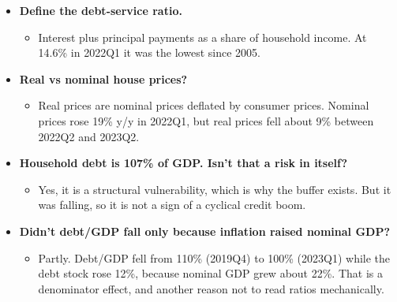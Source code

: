 \documentclass[10pt]{article}
\begin{document}
\begin{tcolorbox}[sbox,width=0.495\linewidth,height=14.6cm,nobeforeafter,box align=top,fit basedim=11pt,colframe=nlred!70,colbacktitle=nlred!8,coltitle=nlred,title=LIKELY CHALLENGES · definitions and logic]
\begin{itemize}
\item[\textcolor{navy}{\textbf{Q}}] \textbf{Define the debt-service ratio.}
\begin{itemize}
\item Interest plus principal payments as a share of household income. At 14.6\% in 2022Q1 it was the lowest since 2005.
\end{itemize}
\item[\textcolor{navy}{\textbf{Q}}] \textbf{Real vs nominal house prices?}
\begin{itemize}
\item Real prices are nominal prices deflated by consumer prices. Nominal prices rose 19\% y/y in 2022Q1, but real prices fell about 9\% between 2022Q2 and 2023Q2.
\end{itemize}
\item[\textcolor{navy}{\textbf{Q}}] \textbf{Household debt is 107\% of GDP. Isn't that a risk in itself?}
\begin{itemize}
\item Yes, it is a structural vulnerability, which is why the buffer exists. But it was falling, so it is not a sign of a cyclical credit boom.
\end{itemize}
\item[\textcolor{navy}{\textbf{Q}}] \textbf{Didn't debt/GDP fall only because inflation raised nominal GDP?}
\begin{itemize}
\item Partly. Debt/GDP fell from 110\% (2019Q4) to 100\% (2023Q1) while the debt stock rose 12\%, because nominal GDP grew about 22\%. That is a denominator effect, and another reason not to read ratios mechanically.
\end{itemize}
\end{itemize}
\end{tcolorbox}
\newpage
\end{document}
